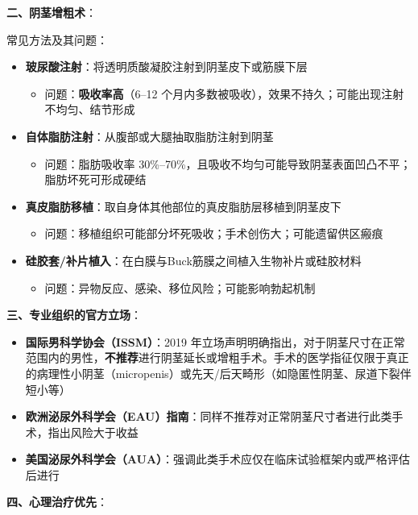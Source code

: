 \begin{enumerate}
\vspace{0.5em}
\noindent\textbf{二、阴茎增粗术}：

常见方法及其问题：
\begin{itemize}[leftmargin=2cm]
	\item \textbf{玻尿酸注射}：将透明质酸凝胶注射到阴茎皮下或筋膜下层
	\begin{itemize}
		\item 问题：\textbf{吸收率高}（6--12 个月内多数被吸收），效果不持久；可能出现注射不均匀、结节形成
	\end{itemize}
	\item \textbf{自体脂肪注射}：从腹部或大腿抽取脂肪注射到阴茎
	\begin{itemize}
		\item 问题：脂肪吸收率 30\%--70\%，且吸收不均匀可能导致阴茎表面凹凸不平；脂肪坏死可形成硬结
	\end{itemize}
	\item \textbf{真皮脂肪移植}：取自身体其他部位的真皮脂肪层移植到阴茎皮下
	\begin{itemize}
		\item 问题：移植组织可能部分坏死吸收；手术创伤大；可能遗留供区瘢痕
	\end{itemize}
	\item \textbf{硅胶套/补片植入}：在白膜与Buck筋膜之间植入生物补片或硅胶材料
	\begin{itemize}
		\item 问题：异物反应、感染、移位风险；可能影响勃起机制
	\end{itemize}
\end{itemize}

\vspace{0.5em}
\noindent\textbf{三、专业组织的官方立场}：

\begin{itemize}[leftmargin=2cm]
	\item \textbf{国际男科学协会（ISSM）}：2019 年立场声明明确指出，对于阴茎尺寸在正常范围内的男性，\textbf{不推荐}进行阴茎延长或增粗手术。手术的医学指征仅限于真正的病理性小阴茎（micropenis）或先天/后天畸形（如隐匿性阴茎、尿道下裂伴短小等）
	\item \textbf{欧洲泌尿外科学会（EAU）指南}：同样不推荐对正常阴茎尺寸者进行此类手术，指出风险大于收益
	\item \textbf{美国泌尿外科学会（AUA）}：强调此类手术应仅在临床试验框架内或严格评估后进行
\end{itemize}

\vspace{0.5em}
\noindent\textbf{四、心理治疗优先}：


\end{enumerate}
